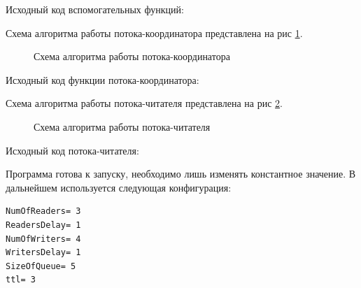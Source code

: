 \documentclass[a4paper]{article}
\begin{document}
Исходный код вспомогательных функций:
	
	
	Схема алгоритма работы потока-координатора представлена на рис \ref{img:thr_coord}.
	\begin{figure}[h!]
		\caption{Схема алгоритма работы потока-координатора}
		\label{img:thr_coord}
	\end{figure}
	
	Исходный код функции потока-координатора:
	

	Схема алгоритма работы потока-читателя представлена на рис \ref{img:thr_reader}.
	\begin{figure}[h!]
		\caption{Схема алгоритма работы потока-читателя}
		\label{img:thr_reader}
	\end{figure}
	Исходный код потока-читателя:
	
	Программа готова к запуску, необходимо лишь изменять константное значение.
	В дальнейшем используется следующая конфигурация:
	\begin{lstlisting}[style=crs_cpp]
NumOfReaders= 3 
ReadersDelay= 1 
NumOfWriters= 4 
WritersDelay= 1 
SizeOfQueue= 5 
ttl= 3
	\end{lstlisting}
	
\end{document}
